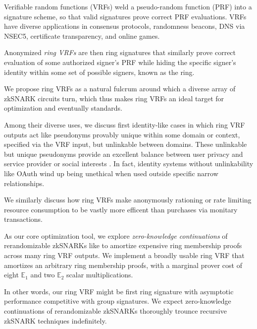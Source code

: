 Verifiable random functions (VRFs) weld a pseudo-random function (PRF) into
a signature scheme, so that valid signatures prove correct PRF evaluations.
VRFs have diverse applications in consensus protocols, randomness
beacons, DNS via NSEC5, certificate transparency, and online games.

\smallskip

Anonymized {\em ring VRFs} are then ring signatures that similarly prove
correct evaluation of some authorized signer's PRF while hiding the
specific signer's identity within some set of possible signers,
 known as the ring.


\smallskip %

We propose ring VRFs as a natural fulcrum around which a diverse array of
zkSNARK circuits turn, which thus makes ring VRFs an ideal target
for optimization and eventually standards. 

\smallskip

Among their diverse uses, we discuss first identity-like cases in which
ring VRF outputs act like pseudonyms provably unique within some domain or
context, specified via the VRF input, but unlinkable between domains. 
These unlinkable but unique pseudonyms provide an excellent balance between
user privacy and service provider or social interests \cite{pop2008}.
%
In fact, identity systems without unlinkability like OAuth wind up being
unethical when used outside specific narrow relationships.

\smallskip

We similarly discuss how ring VRFs make anonymously rationing or
rate limiting resource consumption to be vastly more efficent than
purchases via monitary transactions.

\smallskip %

As our core optimization tool, we explore {\em zero-knowledge continuations}
of rerandomizable zkSNARKs like \cite{Groth16} to amortize expensive
ring membership proofs across many ring VRF outputs. 
%
We implement a broadly usable ring VRF that amortizes an arbitrary
ring membership proofs, with a marginal prover cost
 of eight $\mathbb{E}_1$ and two $\mathbb{E}_2$ scalar multiplications.

\smallskip

In other words, our ring VRF might be first ring signature with asymptotic
performance competitive with group signatures.
%
We expect zero-knowledge continuations of rerandomizable zkSNARKs
thoroughly trounce recursive zkSNARK techniques indefinitely.

